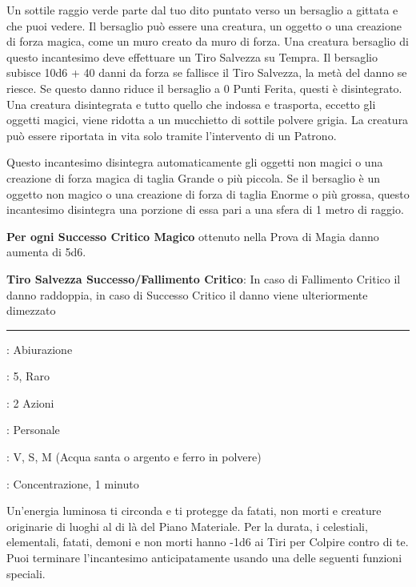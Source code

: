 \begin{multicols}{2}
Un sottile raggio verde parte dal tuo dito puntato verso un bersaglio a gittata e che puoi vedere. Il bersaglio può essere una creatura, un oggetto o una creazione di forza magica, come un muro creato da muro di forza. Una creatura bersaglio di questo incantesimo deve effettuare un Tiro Salvezza su Tempra. Il bersaglio subisce 10d6 + 40 danni da forza se fallisce il Tiro Salvezza, la metà del danno se riesce. Se questo danno riduce il bersaglio a 0 Punti Ferita, questi è disintegrato. Una creatura disintegrata e tutto quello che indossa e trasporta, eccetto gli oggetti magici, viene ridotta a un mucchietto di sottile polvere grigia. La creatura può essere riportata in vita solo tramite l'intervento di un Patrono.

Questo incantesimo disintegra automaticamente gli oggetti non magici o una creazione di forza magica di taglia Grande o più piccola. Se il bersaglio è un oggetto non magico o una creazione di forza di taglia Enorme o più grossa, questo incantesimo disintegra una porzione di essa pari a una sfera di 1 metro di raggio.

\textbf{Per ogni Successo Critico Magico} ottenuto nella Prova di Magia danno aumenta di 5d6.

\textbf{Tiro Salvezza Successo/Fallimento Critico}: In caso di Fallimento Critico il danno raddoppia, in caso di Successo Critico il danno viene ulteriormente dimezzato

\smallskip\noindent\rule{\linewidth}{2pt} \hypertarget{Dissolvi il Bene e il Male}{}\smallskip{}
\noindent
\begin{description}[noitemsep, topsep=0pt, parsep=0pt, partopsep=0pt, leftmargin=0cm, labelwidth=2.8cm]
	\item[\textbf{Lista di Magia}]: Abiurazione
	\item[\textbf{Livello}]: 5, Raro
	\item[\textbf{T. di Lancio}]: 2 Azioni
	\item[\textbf{Gittata}]: Personale
	\item[\textbf{Componenti}]: V, S, M (Acqua santa o argento e ferro in polvere)
	\item[\textbf{Durata}]: Concentrazione, 1 minuto
\end{description}

Un'energia luminosa ti circonda e ti protegge da fatati, non morti e creature originarie di luoghi al di là del Piano Materiale. Per la durata, i celestiali, elementali, fatati, demoni e non morti hanno -1d6 ai Tiri per Colpire contro di te. Puoi terminare l'incantesimo anticipatamente usando una delle seguenti funzioni speciali.


\end{multicols}
